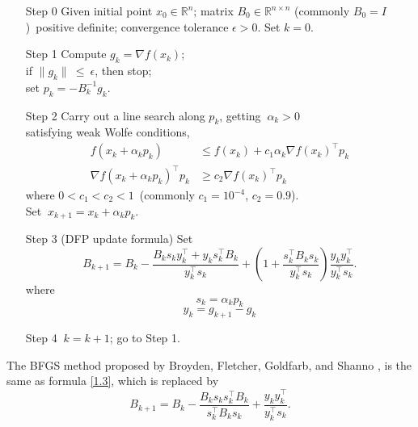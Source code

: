 \documentclass[12pt,a4paper]{article}  %
\newcounter{cite}
\theoremstyle{definition}
\numberwithin{equation}{section}
\newcommand{\RR}{\mathbb{R}}
\begin{document}
\begin{enumerate}[leftmargin=4em]
	\item[Step 0] Given initial point  $x_0 \in 
	\RR^n$; matrix $B_0\in\RR^{n\times n}$ (commonly $B_0= I$)~positive definite;  convergence tolerance $\epsilon > 0$. Set $k=0$. 
	
	\item[Step 1] Compute $g_k=\nabla f(x_k)$;\\ 
	if $\|g_k\|~\leq~\epsilon$, then stop;\\
	set $p_k=-B_k^{-1}g_k$. 
	
	\item[Step 2]Carry out a line search along $p_k$, getting $~\alpha_k > 0$\\
	satisfying weak Wolfe conditions, \begin{subequations}
		\label{eq:group}        
		\begin{align}
			f({x_k} + \alpha_k {p_k}) &\leq f({x_k}) + c_1 \alpha_k \nabla f({x_k})^\top {p_k} \label{eq:wolfe1} \\
			\nabla f({x_k} + \alpha_k {p_k})^\top {p_k} &\geq c_2 \nabla f({x_k})^\top {p_k} \label{eq:wolfe2}
		\end{align}
	\end{subequations}
	where $0 < c_1 < c_2 < 1$~(commonly $c_1=10^{-4}$, $c_2=0.9$).\\
	Set $~x_{k+1}=x_k+\alpha_k p_k$. 
	
	\item[Step 3](DFP update formula) Set
	\begin{equation}
	B_{k+1} = B_k - \frac{B_k s_k y_k^\top + y_k s_k^\top B_k}{y_k^\top s_k}
	+ \left(1 + \frac{s_k^\top B_k s_k}{y_k^\top s_k}\right) \frac{y_k y_k^\top}{y_k^\top s_k}.\label{1.3}
    \end{equation}
	where\begin{equation}
		s_k=\alpha_k p_k
	\end{equation}
	\begin{equation}
	y_k=g_{k+1}-g_k
    \end{equation}
	\item[Step 4] $~k=k+1$; go to Step 1. \\
	
\end{enumerate}
The BFGS method  proposed by Broyden, Fletcher, Goldfarb, and Shanno \cite{10.1093/imamat/6.1.76}, is the same as formula \eqref{1.3}, which is replaced by
\begin{equation}
	B_{k+1} = B_k - \frac{B_k s_k s_k^\top B_k}{s_k^\top B_k s_k} + \frac{y_k y_k^\top}{y_k^\top s_k}.
\end{equation}
\end{document}
